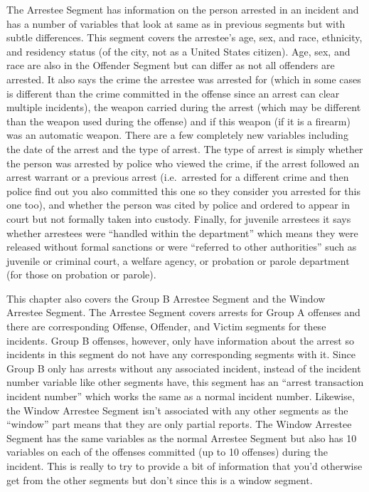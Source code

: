 \documentclass[
]{krantz}
\begin{document}
The Arrestee Segment has information on the person arrested
in an incident and has a number of variables that look at
same as in previous segments but with subtle differences.
This segment covers the arrestee's age, sex, and race,
ethnicity, and residency status (of the city, not as a
United States citizen). Age, sex, and race are also in the
Offender Segment but can differ as not all offenders are
arrested. It also says the crime the arrestee was arrested
for (which in some cases is different than the crime
committed in the offense since an arrest can clear multiple
incidents), the weapon carried during the arrest (which may
be different than the weapon used during the offense) and if
this weapon (if it is a firearm) was an automatic weapon.
There are a few completely new variables including the date
of the arrest and the type of arrest. The type of arrest is
simply whether the person was arrested by police who viewed
the crime, if the arrest followed an arrest warrant or a
previous arrest (i.e.~arrested for a different crime and
then police find out you also committed this one so they
consider you arrested for this one too), and whether the
person was cited by police and ordered to appear in court
but not formally taken into custody. Finally, for juvenile
arrestees it says whether arrestees were ``handled within
the department'' which means they were released without
formal sanctions or were ``referred to other authorities''
such as juvenile or criminal court, a welfare agency, or
probation or parole department (for those on probation or
parole).

This chapter also covers the Group B Arrestee Segment and
the Window Arrestee Segment. The Arrestee Segment covers
arrests for Group A offenses and there are corresponding
Offense, Offender, and Victim segments for these incidents.
Group B offenses, however, only have information about the
arrest so incidents in this segment do not have any
corresponding segments with it. Since Group B only has
arrests without any associated incident, instead of the
incident number variable like other segments have, this
segment has an ``arrest transaction incident number'' which
works the same as a normal incident number. Likewise, the
Window Arrestee Segment isn't associated with any other
segments as the ``window'' part means that they are only
partial reports. The Window Arrestee Segment has the same
variables as the normal Arrestee Segment but also has 10
variables on each of the offenses committed (up to 10
offenses) during the incident. This is really to try to
provide a bit of information that you'd otherwise get from
the other segments but don't since this is a window segment.
\end{document}
